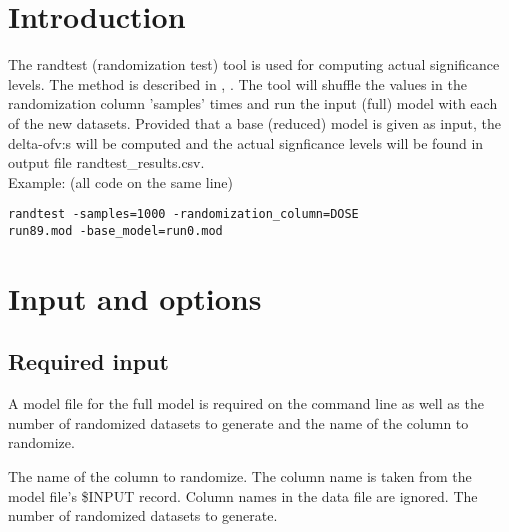 



\maketitle
\newcommand{\guidetoolname}{randtest}


\section{Introduction}

The randtest (randomization test) tool is used for computing actual significance levels. The method is described in \cite{Wahlby}, \cite{Deng}. 
The tool will shuffle the values in the randomization column ’samples’ times and run the input (full) model with each of the new datasets. Provided that a base (reduced) model is given as input, the delta-ofv:s will be computed and the actual signficance levels will be found in output file randtest\_results.csv.\\
Example: (all code on the same line)
\begin{verbatim}
randtest -samples=1000 -randomization_column=DOSE 
run89.mod -base_model=run0.mod
\end{verbatim}

\section{Input and options}
\subsection{Required input}
A model file for the full model is required on the command line as well as the number of randomized datasets to generate and the name of the column to randomize.
\begin{optionlist}
	The name of the column to randomize. The column name is taken from the model file's \$INPUT record. Column names in the data file are ignored. 
\nextopt
{}
The number of randomized datasets to generate. 
\nextopt
\end{optionlist}

